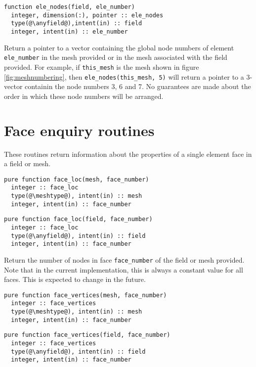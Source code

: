 \documentclass[a4paper, 11pt]{book}
\begin{document}
\begin{lstlisting}
function ele_nodes(field, ele_number)
  integer, dimension(:), pointer :: ele_nodes
  type(@\anyfield@),intent(in) :: field
  integer, intent(in) :: ele_number
\end{lstlisting}

Return a pointer to a vector containing the global node numbers of
element \lstinline+ele_number+ in the mesh provided or in the mesh
associated with the field provided. For example, if \lstinline+this_mesh+ is the
mesh shown in figure \ref{fig:meshnumbering}, then
\lstinline+ele_nodes(this_mesh, 5)+ will return a pointer to a 3-vector
containin the node numbers 3, 6 and 7. No guarantees are made about the
order in which these node numbers will be arranged. 

\section{Face enquiry routines}

These routines return information about the properties of a single element face
in a field or mesh.


\begin{lstlisting}
pure function face_loc(mesh, face_number)
  integer :: face_loc
  type(@\meshtype@), intent(in) :: mesh
  integer, intent(in) :: face_number
\end{lstlisting}

\begin{lstlisting}
pure function face_loc(field, face_number)
  integer :: face_loc
  type(@\anyfield@), intent(in) :: field
  integer, intent(in) :: face_number
\end{lstlisting}

Return the number of nodes in face \lstinline+face_number+ of the field
or mesh provided. Note that in the current implementation, this is always a
constant value for all faces. This is expected to change in the future.


\begin{lstlisting}
pure function face_vertices(mesh, face_number)
  integer :: face_vertices
  type(@\meshtype@), intent(in) :: mesh
  integer, intent(in) :: face_number
\end{lstlisting}

\begin{lstlisting}
pure function face_vertices(field, face_number)
  integer :: face_vertices
  type(@\anyfield@), intent(in) :: field
  integer, intent(in) :: face_number
\end{lstlisting}
\end{document}
